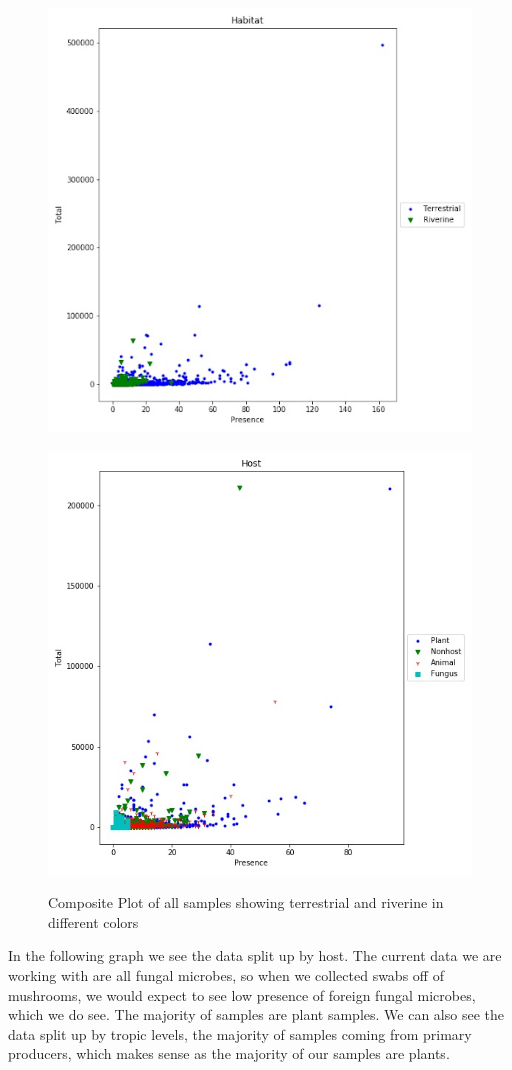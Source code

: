 \documentclass{article}
\theoremstyle{definition} \newtheorem*{lte}{Definition}
\theoremstyle{plain} \newtheorem*{csbt}{Theorem}
\begin{document}
 \begin{figure}[H]
\begin{subfloat}{
  \includegraphics[width=.45\linewidth]{habitatcomp.png}
  \label{fig:habitatcomp}}
\end{subfloat}
\hspace{.1cm}
\begin{subfloat}{
  \includegraphics[width=.45\linewidth]{HostPlot.jpg}
  \label{fig:hostcomp}}
  \end{subfloat}
  \caption{ Composite Plot of all samples showing terrestrial and riverine in different colors}
\end{figure}

In the following graph we see the data split up by host. The current data we are working with are all fungal microbes, so when we collected swabs off of mushrooms, we would expect to see low presence of foreign fungal microbes, which we do see. The majority of samples are plant samples. We can also see the data split up by tropic levels, the majority of samples coming from primary producers, which makes sense as the majority of our samples are plants. 
\end{document}
